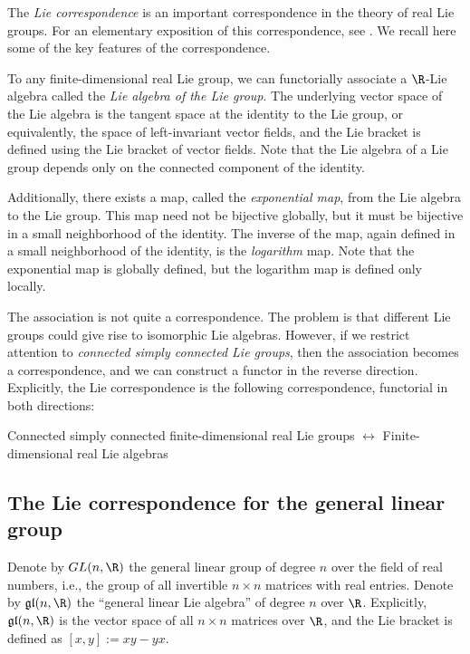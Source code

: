 \documentclass{ucetd}
\begin{document}
The {\em Lie correspondence} is an important correspondence in the
theory of real Lie groups. For an elementary exposition of this
correspondence, see \cite{vsv}. We recall here some of the key
features of the correspondence.

To any finite-dimensional real Lie group, we can functorially
associate a $\R$-Lie algebra called the {\em Lie algebra of the Lie
  group}. The underlying vector space of the Lie algebra is the
tangent space at the identity to the Lie group, or equivalently, the
space of left-invariant vector fields, and the Lie bracket is defined
using the Lie bracket of vector fields. Note that the Lie algebra of a
Lie group depends only on the connected component of the identity.

Additionally, there exists a map, called the {\em exponential map},
from the Lie algebra to the Lie group. This map need not be bijective
globally, but it must be bijective in a small neighborhood of the
identity. The inverse of the map, again defined in a small
neighborhood of the identity, is the {\em logarithm} map. Note that
the exponential map is globally defined, but the logarithm map is
defined only locally.

The association is not quite a correspondence. The problem is that
different Lie groups could give rise to isomorphic Lie
algebras. However, if we restrict attention to {\em connected simply
  connected Lie groups}, then the association becomes a
correspondence, and we can construct a functor in the reverse
direction. Explicitly, the Lie correspondence is the following
correspondence, functorial in both directions:

\begin{center}
  Connected simply connected finite-dimensional real Lie groups
  $\leftrightarrow$ Finite-dimensional real Lie algebras
\end{center}

\subsection{The Lie correspondence for the general linear group}\label{sec:lie-correspondence-gln}

Denote by $GL(n,\R)$ the general linear group of degree $n$ over the
field of real numbers, i.e., the group of all invertible $n \times n$
matrices with real entries. Denote by $\mathfrak{g}\mathfrak{l}(n,\R)$ the ``general linear
Lie algebra'' of degree $n$ over $\R$. Explicitly, $\mathfrak{g}\mathfrak{l}(n,\R)$ is the
vector space of all $n \times n$ matrices over $\R$, and the Lie
bracket is defined as $[x,y] := xy - yx$.
\end{document}
